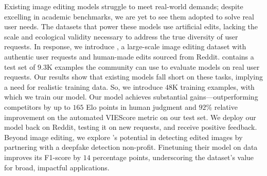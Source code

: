 
Existing image editing models struggle to meet real-world demands; despite excelling in academic benchmarks, we are yet to see them adopted to solve real user needs. 
The datasets that power these models use artificial edits, lacking the scale and ecological validity necessary to address the true diversity of user requests. 
In response, we introduce \ours, a large-scale image editing dataset with authentic user requests and human-made edits sourced from Reddit. \ours contains a test set of $9.3$K examples the community can use to evaluate models on real user requests. 
Our results show that existing models fall short on these tasks, implying a need for realistic training data.
So, we introduce $48$K training examples, with which we train our \ours model. 
Our model achieves substantial gains—outperforming competitors by up to $165$ Elo points in human judgment and $92\%$ relative improvement on the automated VIEScore metric on our test set. We deploy our model back on Reddit, testing it on new requests, and receive positive feedback. 
Beyond image editing, we explore \ours’s potential in detecting edited images by partnering with a deepfake detection non-profit. Finetuning their model on \ours data improves its F1-score by $14$ percentage points, underscoring the dataset's value for broad, impactful applications.